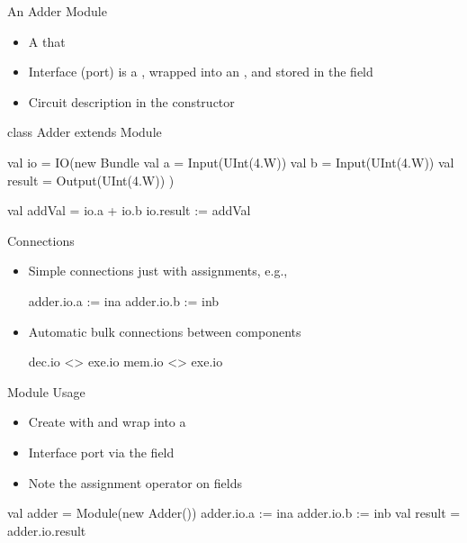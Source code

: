 \begin{frame}[fragile]{An Adder Module}
\begin{itemize}
\item A  that  
\item Interface (port) is a , wrapped into an , and stored in the field 
\item Circuit description in the constructor
\end{itemize}
\begin{chisel}
class Adder extends Module {
  val io = IO(new Bundle {
    val a = Input(UInt(4.W))
    val b = Input(UInt(4.W))
    val result = Output(UInt(4.W))
  })

  val addVal = io.a + io.b
  io.result := addVal
}
\end{chisel}
\end{frame}


\begin{frame}[fragile]{Connections}
\begin{itemize}
\item Simple connections just with assignments, e.g.,
\begin{chisel}
  adder.io.a := ina
  adder.io.b := inb
\end{chisel}
\item Automatic bulk connections between components
\begin{chisel}
  dec.io <> exe.io
  mem.io <> exe.io
\end{chisel}
\end{itemize}
\end{frame}

\begin{frame}[fragile]{Module Usage}
\begin{itemize}
\item Create with  and wrap into a 
\item Interface port via the  field
\item Note the assignment operator \code{:=} on  fields
\end{itemize}
\begin{chisel}
  val adder = Module(new Adder())
  adder.io.a := ina
  adder.io.b := inb
  val result = adder.io.result
\end{chisel}
\end{frame}


